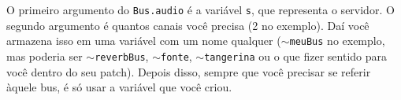 O primeiro argumento do \texttt{Bus.audio} é a variável \texttt{s}, que representa o servidor. O segundo argumento é quantos canais você precisa (2 no exemplo). Daí você armazena isso em uma variável com um nome qualquer (\texttt{$\sim$meuBus} no exemplo, mas poderia ser \texttt{$\sim$reverbBus}, \texttt{$\sim$fonte}, \texttt{$\sim$tangerina} ou o que fizer sentido para você dentro do seu patch). Depois disso, sempre que você precisar se referir àquele bus, é só usar a variável que você criou.
